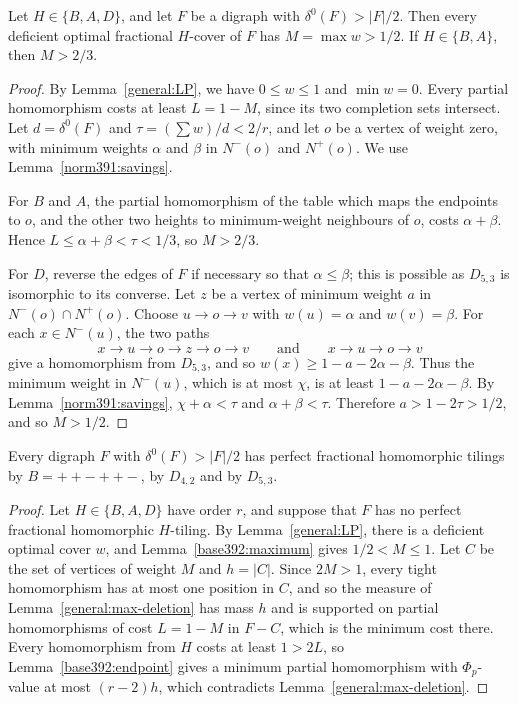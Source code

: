 \begin{lemma}
\label{base392:maximum}\label{aux:d53maximum}
Let $H\in\{B,A,D\}$, and let $F$ be a digraph with $\delta^0(F)>|F|/2$. Then every deficient optimal fractional $H$-cover of $F$
has $M=\max w>1/2$. If $H\in\{B,A\}$, then $M>2/3$.
\end{lemma}
\begin{proof}
By Lemma~\ref{general:LP}, we have $0\le w\le1$ and $\min w=0$. Every partial homomorphism costs at least $L=1-M$, since
its two completion sets intersect. Let $d=\delta^0(F)$ and
$\tau=(\sum w)/d<2/r$, and let $o$ be a vertex of weight zero, with minimum weights $\alpha$ and $\beta$ in $N^-(o)$ and $N^+(o)$. We use Lemma~\ref{norm391:savings}.

For $B$ and $A$, the partial homomorphism of the table which maps the endpoints to $o$, and the other two heights to minimum-weight neighbours of $o$, costs
$\alpha+\beta$. Hence $L\le\alpha+\beta<\tau<1/3$, so $M>2/3$.

For $D$, reverse the edges of $F$ if necessary so that $\alpha\le\beta$;
this is possible as $D_{5,3}$ is isomorphic to its converse. Let $z$ be
a vertex of minimum weight $a$ in $N^-(o)\cap N^+(o)$.
Choose $u\to o\to v$ with $w(u)=\alpha$ and $w(v)=\beta$. For each $x\in N^-(u)$, the two paths
\[
 x\to u\to o\to z\to o\to v\qquad\text{and}\qquad x\to u\to o\to v
\]
give a homomorphism from $D_{5,3}$, and so $w(x)\ge1-a-2\alpha-\beta$. Thus the minimum weight in $N^-(u)$, which is at most $\chi$, is at least $1-a-2\alpha-\beta$.
By Lemma~\ref{norm391:savings}, $\chi+\alpha<\tau$ and $\alpha+\beta<\tau$. Therefore $a>1-2\tau>1/2$, and so $M>1/2$.
\end{proof}

\begin{theorem}
\label{base392:fractional}
\label{b:fractional}\label{a:fractional}\label{repair:d53-factor}
Every digraph $F$ with $\delta^0(F)>|F|/2$ has perfect fractional homomorphic
tilings by $B=++-++-$, by $D_{4,2}$ and by $D_{5,3}$.
\end{theorem}
\begin{proof}
Let $H\in\{B,A,D\}$ have order $r$, and suppose that $F$ has no perfect fractional homomorphic $H$-tiling. By Lemma~\ref{general:LP}, there is a deficient optimal cover $w$, and Lemma~\ref{base392:maximum} gives $1/2<M\le1$.
Let $C$ be the set of vertices of weight $M$ and $h=|C|$. Since $2M>1$, every tight homomorphism has at most one position in $C$, and so the measure of
Lemma~\ref{general:max-deletion} has mass $h$ and is supported on
partial homomorphisms of cost $L=1-M$ in $F-C$, which is the minimum cost there.
Every homomorphism from $H$ costs at least $1>2L$, so
Lemma~\ref{base392:endpoint} gives a minimum partial homomorphism with $\Phi_p$-value at most $(r-2)h$, which contradicts
Lemma~\ref{general:max-deletion}.
\end{proof}


